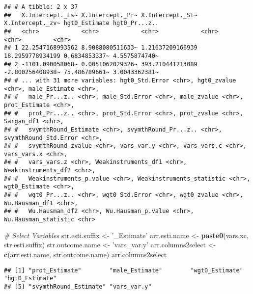 \documentclass[
]{book}
\newenvironment{Shaded}{\begin{snugshade}}{\end{snugshade}}
\newcommand{\CommentTok}[1]{\textcolor[rgb]{0.56,0.35,0.01}{\textit{#1}}}
\newcommand{\KeywordTok}[1]{\textcolor[rgb]{0.13,0.29,0.53}{\textbf{#1}}}
\newcommand{\NormalTok}[1]{#1}
\newcommand{\OperatorTok}[1]{\textcolor[rgb]{0.81,0.36,0.00}{\textbf{#1}}}
\newcommand{\StringTok}[1]{\textcolor[rgb]{0.31,0.60,0.02}{#1}}
\begin{document}
\begin{verbatim}
## # A tibble: 2 x 37
##   X.Intercept._Es~ X.Intercept._Pr~ X.Intercept._St~ X.Intercept._zv~ hgt0_Estimate hgt0_Pr...z..
##   <chr>            <chr>            <chr>            <chr>            <chr>         <chr>        
## 1 22.2547168993562 8.9088080511633~ 1.21637209166939 18.2959778934199 0.6834853337~ 4.5575874740~
## 2 -1101.090058068~ 0.0051062029326~ 393.210441213089 -2.800256408938~ 75.486789661~ 3.0043362381~
## # ... with 31 more variables: hgt0_Std.Error <chr>, hgt0_zvalue <chr>, male_Estimate <chr>,
## #   male_Pr...z.. <chr>, male_Std.Error <chr>, male_zvalue <chr>, prot_Estimate <chr>,
## #   prot_Pr...z.. <chr>, prot_Std.Error <chr>, prot_zvalue <chr>, Sargan_df1 <chr>,
## #   svymthRound_Estimate <chr>, svymthRound_Pr...z.. <chr>, svymthRound_Std.Error <chr>,
## #   svymthRound_zvalue <chr>, vars_var.y <chr>, vars_vars.c <chr>, vars_vars.x <chr>,
## #   vars_vars.z <chr>, Weakinstruments_df1 <chr>, Weakinstruments_df2 <chr>,
## #   Weakinstruments_p.value <chr>, Weakinstruments_statistic <chr>, wgt0_Estimate <chr>,
## #   wgt0_Pr...z.. <chr>, wgt0_Std.Error <chr>, wgt0_zvalue <chr>, Wu.Hausman_df1 <chr>,
## #   Wu.Hausman_df2 <chr>, Wu.Hausman_p.value <chr>, Wu.Hausman_statistic <chr>
\end{verbatim}

\begin{Shaded}
\begin{Highlighting}[]
\CommentTok{# Select Variables}
\NormalTok{str.esti.suffix <-}\StringTok{ '_Estimate'}
\NormalTok{arr.esti.name <-}\StringTok{ }\KeywordTok{paste0}\NormalTok{(vars.xc, str.esti.suffix)}
\NormalTok{str.outcome.name <-}\StringTok{ 'vars_var.y'}
\NormalTok{arr.columns2select <-}\StringTok{ }\KeywordTok{c}\NormalTok{(arr.esti.name, str.outcome.name)}
\NormalTok{arr.columns2select}
\end{Highlighting}
\end{Shaded}

\begin{verbatim}
## [1] "prot_Estimate"        "male_Estimate"        "wgt0_Estimate"        "hgt0_Estimate"       
## [5] "svymthRound_Estimate" "vars_var.y"
\end{verbatim}

\begin{Shaded}
\end{Shaded}
\end{document}
